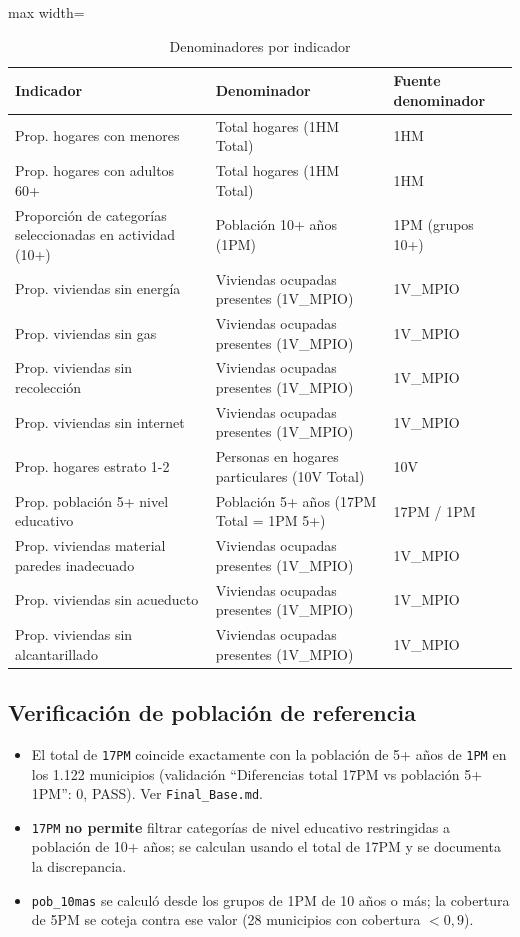\begin{table}[htbp]
\centering
\caption{Denominadores por indicador}
\label{tab:denominadores}
\begin{adjustbox}{max width=\textwidth}
\begin{tabular}{@{}lll@{}}
\toprule
\textbf{Indicador} & \textbf{Denominador} & \textbf{Fuente denominador} \\
\midrule
Prop. hogares con menores & Total hogares (1HM Total) & 1HM \\
Prop. hogares con adultos 60+ & Total hogares (1HM Total) & 1HM \\
Proporción de categorías seleccionadas en actividad (10+) & Población 10+ años (1PM) & 1PM (grupos 10+) \\
Prop. viviendas sin energía & Viviendas ocupadas presentes (1V\_MPIO) & 1V\_MPIO \\
Prop. viviendas sin gas & Viviendas ocupadas presentes (1V\_MPIO) & 1V\_MPIO \\
Prop. viviendas sin recolección & Viviendas ocupadas presentes (1V\_MPIO) & 1V\_MPIO \\
Prop. viviendas sin internet & Viviendas ocupadas presentes (1V\_MPIO) & 1V\_MPIO \\
Prop. hogares estrato 1-2 & Personas en hogares particulares (10V Total) & 10V \\
Prop. población 5+ nivel educativo & Población 5+ años (17PM Total = 1PM 5+) & 17PM / 1PM \\
Prop. viviendas material paredes inadecuado & Viviendas ocupadas presentes (1V\_MPIO) & 1V\_MPIO \\
Prop. viviendas sin acueducto & Viviendas ocupadas presentes (1V\_MPIO) & 1V\_MPIO \\
Prop. viviendas sin alcantarillado & Viviendas ocupadas presentes (1V\_MPIO) & 1V\_MPIO \\
\bottomrule
\end{tabular}
\end{adjustbox}
\end{table}

\subsection{Verificación de población de referencia}
\label{sec:verif_pob_ref}

\begin{itemize}
    \item El total de \texttt{17PM} coincide exactamente con la población de 5+ años de \texttt{1PM} en los 1.122 municipios (validación ``Diferencias total 17PM vs población 5+ 1PM'': 0, PASS). Ver \texttt{Final\_Base.md}.
    \item \texttt{17PM} \textbf{no permite} filtrar categorías de nivel educativo restringidas a población de 10+ años; se calculan usando el total de 17PM y se documenta la discrepancia.
    \item \texttt{pob\_10mas} se calculó desde los grupos de 1PM de 10 años o más; la cobertura de 5PM se coteja contra ese valor (28 municipios con cobertura $<0,9$).
\end{itemize}

